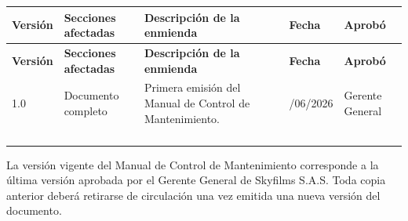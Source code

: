 \begin{longtable}{|>{\centering\arraybackslash}p{1.6cm}|p{3.0cm}|p{5.6cm}|>{\centering\arraybackslash}p{1.9cm}|p{2.3cm}|}

\hline

\rowcolor{gray!20}

\textbf{Versión} &
\textbf{Secciones afectadas} &
\textbf{Descripción de la enmienda} &
\textbf{Fecha} &
\textbf{Aprobó}

\\
\hline

\endfirsthead

\hline

\rowcolor{gray!20}

\textbf{Versión} &
\textbf{Secciones afectadas} &
\textbf{Descripción de la enmienda} &
\textbf{Fecha} &
\textbf{Aprobó}

\\
\hline

\endhead

1.0 &
Documento completo &
Primera emisión del Manual de Control de Mantenimiento. &
23/06/2026 &
Gerente General

\\
\hline

&
&
&
&
\\
\hline

&
&
&
&
\\
\hline

&
&
&
&
\\
\hline

&
&
&
&
\\
\hline

\end{longtable}

\vspace{0.4cm}

\begin{tcolorbox}[
colback=gray!5,
colframe=black,
title=Control Documental]

La versión vigente del Manual de Control de Mantenimiento corresponde a la última versión aprobada por el Gerente General de Skyfilms S.A.S. Toda copia anterior deberá retirarse de circulación una vez emitida una nueva versión del documento.

\end{tcolorbox}
